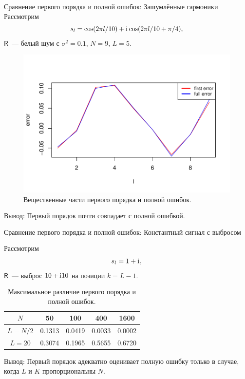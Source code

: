 \documentclass[ucs, notheorems, handout]{beamer}
\newcommand{\tX}[1]{\mathsf{#1}}
\newcommand{\iu}{\mathrm{i}\mkern1mu}
\begin{document}
\begin{frame}{Сравнение первого порядка и полной ошибок: Зашумлённые гармоники}
Рассмотрим
$$s_l = \cos(2 \pi l / 10) + \iu\cos(2 \pi l / 10 + \pi/4),$$
$\tX{R}$~--- белый шум с $\sigma^2 = 0.1$, $N = 9$, $L = 5$.
\begin{figure}[H]
	\begin{center}
		\includegraphics[width=0.6\linewidth]{img/first_vs_full_re.pdf}
		\caption{Вещественные части первого порядка и полной ошибок.}
		\label{fig:harm_noise}
	\end{center}
\end{figure}
\alert{Вывод:} Первый порядок почти совпадает с полной ошибкой.

\end{frame}

\begin{frame}{Сравнение первого порядка и полной ошибок: Константный сигнал с выбросом}

Рассмотрим
$$s_l = 1 + \iu,$$
$\tX{R}$~--- выброс $10 + \iu 10$ на позиции $k = L - 1$.

\begin{table}[H]
	\begin{center}
		\caption{Максимальное различие первого порядка и полной ошибок.}
		\label{tab:const_outl}
		\begin{tabular}{|c|c|c|c|c|}
			\hline
			$N$	& 50 & 100 & 400 & 1600 \\
			\hline
			$L = N / 2$ & 0.1313  & 0.0419  & 0.0033 & 0.0002 \\
			\hline
			$L = 20$ & 0.3074  & 0.1965  & 0.5655 & 0.6720 \\
			\hline
		\end{tabular}
	\end{center}
\end{table}

\alert{Вывод:} Первый порядок адекватно оценивает полную ошибку только в случае, когда $L$ и $K$ пропорциональны $N$.

\end{frame}
\end{document}
